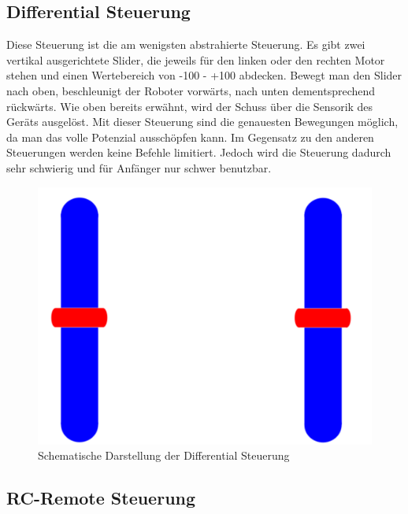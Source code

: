 \subsection{Differential Steuerung}
\label{sec:differentialsteuerung}

Diese Steuerung ist die am wenigsten abstrahierte Steuerung. Es gibt zwei vertikal ausgerichtete Slider, die jeweils für den linken oder den rechten Motor stehen und einen Wertebereich von -100 - +100 abdecken. Bewegt man den Slider nach oben, beschleunigt der Roboter vorwärts, nach unten dementsprechend rückwärts. Wie oben bereits erwähnt, wird der Schuss über die Sensorik des Geräts ausgelöst. Mit dieser Steuerung sind die genauesten Bewegungen möglich, da man das volle Potenzial ausschöpfen kann. Im Gegensatz zu den anderen Steuerungen werden keine Befehle limitiert. Jedoch wird die Steuerung dadurch sehr schwierig und für Anfänger nur schwer benutzbar.

\begin{figure}[h!]
	\centering
	\includegraphics[height=.25\textheight]{images/android_diff.pdf}
	\caption{Schematische Darstellung der Differential Steuerung}
	\label{fig:android_diff}
\end{figure}

\subsection{RC-Remote Steuerung}


